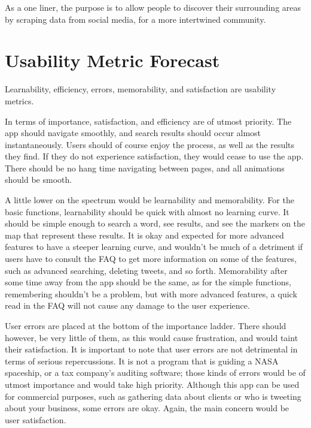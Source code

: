 \documentclass[11pt]{article}
\begin{document}
As a one liner, the purpose is to allow people to discover their surrounding areas by scraping data from social media, for a more intertwined community.

\section{Usability Metric Forecast}
Learnability, efficiency, errors, memorability, and satisfaction are usability metrics. 

In terms of importance, satisfaction, and efficiency are of utmost priority. The app should navigate smoothly, and search results should occur almost instantaneously. Users should of course enjoy the process, as well as the results they find. If they do not experience satisfaction, they would cease to use the app. There should be no hang time navigating between pages, and all animations should be smooth. 

A little lower on the spectrum would be learnability and memorability. For the basic functions, learnability should be quick with almost no learning curve. It should be simple enough to search a word, see results, and see the markers on the map that represent these results. It is okay and expected for more advanced features to have a steeper learning curve, and wouldn't  be much of a detriment if users have to consult the FAQ to get more information on some of the features, such as advanced searching, deleting tweets, and so forth. Memorability after some time away from the app should be the same, as for the simple functions, remembering shouldn't be a problem, but with more advanced features, a quick read in the FAQ will not cause any damage to the user experience.

User errors are placed at the bottom of the importance ladder. There should however, be very little of them, as this would cause frustration, and would taint their satisfaction. It is important to note that user errors are not detrimental in terms of serious repercussions. It is not a program that is guiding a NASA spaceship, or a tax company's auditing software; those kinds of errors would be of utmost importance and would take high priority. Although this app can be used for commercial purposes, such as gathering data about clients or who is tweeting about your business, some errors are okay. Again, the main concern would be user satisfaction.

\end{document}
